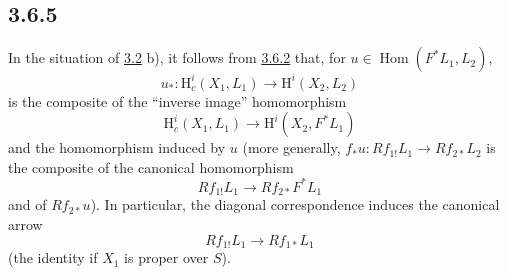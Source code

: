 \documentclass[11pt]{article}
\renewcommand{\H}{\mathrm{H}}
\DeclareMathOperator{\Hom}{Hom}
\providecommand{\Hom}{\operatorname{Hom}}
\providecommand{\Hom}{\operatorname{Hom}}
\begin{document}
\subsection*{3.6.5}\label{sga5:III:subsection:3.6.5}
In the situation of \hyperref[sga5:III:subsection:3.2]{3.2} b), it follows from \hyperref[sga5:III:equation:3.6.2]{3.6.2} that, for $u\in\Hom(F^*L_1,L_2)$,
\[
u_*:\H_c^i(X_1,L_1)\longrightarrow \H^i(X_2,L_2)
\]
is the composite of the ``inverse image'' homomorphism
\[
\H_c^i(X_1,L_1)\longrightarrow \H^i(X_2,F^*L_1)
\]
and the homomorphism induced by $u$ (more generally, $f_*u:Rf_{1!}L_1\to Rf_{2*}L_2$ is the composite of the canonical homomorphism
\[
Rf_{1!}L_1\longrightarrow Rf_{2*}F^*L_1
\]
and of $Rf_{2*}u$). In particular, the diagonal correspondence induces the canonical arrow
\[
Rf_{1!}L_1\longrightarrow Rf_{1*}L_1
\]
(the identity if $X_1$ is proper over $S$).
\end{document}
